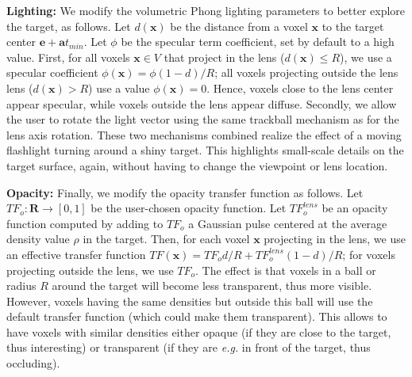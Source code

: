 \vspace{0.2cm}
\noindent\textbf{Lighting:} We modify the volumetric Phong lighting parameters to better explore the target, as follows. Let $d(\mathbf{x})$ be the distance from a voxel $\mathbf{x}$ to the target center $\mathbf{e} + \mathbf{a}t_{min}$. Let $\phi$ be the specular term coefficient, set by default to a high value. First, for all voxels $\mathbf{x} \in V$ that project in the lens ($d(\mathbf{x}) \leq R$), we use a specular coefficient $\phi(\mathbf{x}) = \phi (1-d)/R$; all voxels projecting outside the lens lens ($d(\mathbf{x}) > R$) use a value $\phi(\mathbf{x}) = 0$. Hence, voxels close to the lens center appear specular, while voxels outside the lens appear diffuse. Secondly, we allow the user to rotate the light vector using the same trackball mechanism as for the lens axis rotation. These two mechanisms combined realize the effect of a moving flashlight turning around a shiny target. This highlights small-scale details on the target surface, again, without having to change the viewpoint or lens location.

\vspace{0.2cm}
\noindent\textbf{Opacity:} Finally, we modify the opacity transfer function as follows. Let $TF_{o} : \mathbf{R} \rightarrow [0,1]$ be the user-chosen opacity function. Let  $TF^{lens}_{o}$ be an opacity function computed by adding to $TF_{o}$ a Gaussian pulse centered at the average density value $\rho$ in the target. Then, for each voxel $\mathbf{x}$ projecting in the lens, we use an effective transfer function $TF(\mathbf{x}) = TF_{o} d/R + TF^{lens}_{o} (1-d)/R$; for voxels projecting outside the lens, we use $TF_{o}$. The effect is that voxels in a ball or radius $R$ around the target will become less transparent, thus more visible. However, voxels having the same densities but outside this ball will use the default transfer function (which could make them transparent). This allows to have voxels with similar densities either opaque (if they are close to the target, thus interesting) or transparent (if they are \emph{e.g.} in front of the target, thus occluding).


